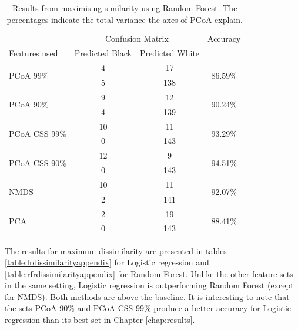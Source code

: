 \begin{table}[h]
	\centering
	\begin{tabular}{l c  c c}
		\toprule
		&\multicolumn{2}{c}{Confusion Matrix} & Accuracy\\
		Features used & Predicted Black&Predicted White&\\
		\midrule
		\multirow{2}{*}{PCoA 99\%} &4 &17&\multirow{2}{*}{86.59\%}\\
		&	 5&138&\\
		\cmidrule{2-3}
		\multirow{2}{*}{PCoA 90\%} &9 &12&\multirow{2}{*}{90.24\%}\\
		&	 4&139&\\
		\cmidrule{2-3}
		\multirow{2}{*}{PCoA CSS 99\%} &10 &11&\multirow{2}{*}{93.29\%}\\
		&	 0&143&\\
		\cmidrule{2-3}
		\multirow{2}{*}{PCoA CSS 90\%} &12 &9&\multirow{2}{*}{94.51\%}\\
		&	 0&143&\\
		\cmidrule{2-3}
		\multirow{2}{*}{NMDS}&10 &11&\multirow{2}{*}{92.07\%}\\
		&	 2&141&\\
						\cmidrule{2-3}
		\multirow{2}{*}{PCA}&2 &19&\multirow{2}{*}{88.41\%}\\
		&	 0&143&\\
		\bottomrule
	\end{tabular}
	\caption{Results from maximising similarity using Random Forest. The percentages indicate the total variance the axes of PCoA explain.}
	\label{table:rfrsimilarityappendix}
\end{table}






The results for maximum dissimilarity are presented in tables \ref{table:lrdissimilarityappendix} for Logistic regression and \ref{table:rfrdissimilarityappendix} for Random Forest. Unlike the other feature sets in the same setting, Logistic regression is outperforming Random Forest (except for NMDS). Both methods are above the baseline. It is interesting to note that the sets PCoA 90\% and PCoA CSS 99\% produce a better accuracy for Logistic regression than its best set in Chapter \ref{chap:results}. 

